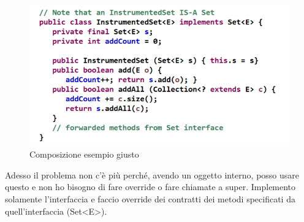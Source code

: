 	\begin{figure}[H]
\centering
\includegraphics[scale=0.8]{images/composizione2}
\caption{Composizione esempio giusto\label{fig:UC3}}
\end{figure}
Adesso il problema non c’è più perché, avendo un oggetto interno, posso usare questo e non ho bisogno di fare override o fare chiamate a super. Implemento solamente l’interfaccia e faccio override dei contratti dei metodi specificati da quell’interfaccia (Set<E>).